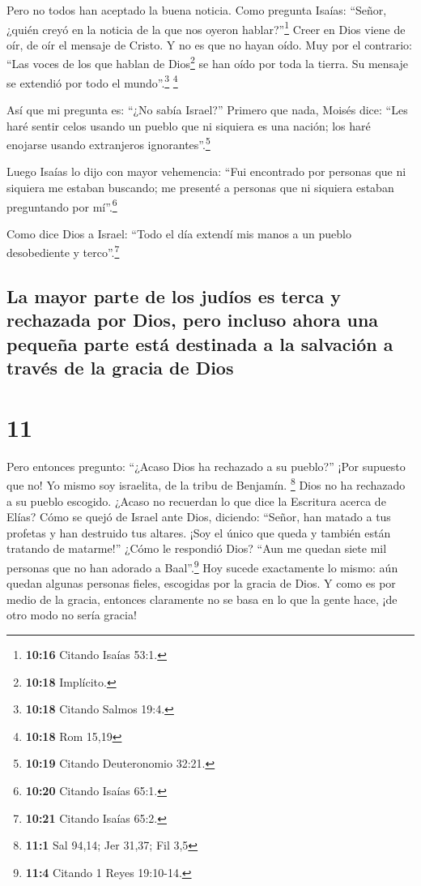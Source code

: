  Pero no todos han aceptado la buena noticia. Como
pregunta Isaías: ``Señor, ¿quién creyó en la noticia de la que nos
oyeron hablar?''\footnote{\textbf{10:16} Citando Isaías 53:1.}
 Creer en Dios viene de oír, de oír el mensaje de Cristo.
 Y no es que no hayan oído. Muy por el contrario: ``Las
voces de los que hablan de Dios\footnote{\textbf{10:18} Implícito.} se
han oído por toda la tierra. Su mensaje se extendió por todo el
mundo''.\footnote{\textbf{10:18} Citando Salmos 19:4.} \footnote{\textbf{10:18}
  Rom 15,19}

 Así que mi pregunta es: ``¿No sabía Israel?'' Primero
que nada, Moisés dice: ``Les haré sentir celos usando un pueblo que ni
siquiera es una nación; los haré enojarse usando extranjeros
ignorantes''.\footnote{\textbf{10:19} Citando Deuteronomio 32:21.}

 Luego Isaías lo dijo con mayor vehemencia: ``Fui
encontrado por personas que ni siquiera me estaban buscando; me presenté
a personas que ni siquiera estaban preguntando por mí''.\footnote{\textbf{10:20}
  Citando Isaías 65:1.}

 Como dice Dios a Israel: ``Todo el día extendí mis manos
a un pueblo desobediente y terco''.\footnote{\textbf{10:21} Citando
  Isaías 65:2.}

\hypertarget{la-mayor-parte-de-los-juduxedos-es-terca-y-rechazada-por-dios-pero-incluso-ahora-una-pequeuxf1a-parte-estuxe1-destinada-a-la-salvaciuxf3n-a-travuxe9s-de-la-gracia-de-dios}{%
\subsection{La mayor parte de los judíos es terca y rechazada por Dios,
pero incluso ahora una pequeña parte está destinada a la salvación a
través de la gracia de
Dios}\label{la-mayor-parte-de-los-juduxedos-es-terca-y-rechazada-por-dios-pero-incluso-ahora-una-pequeuxf1a-parte-estuxe1-destinada-a-la-salvaciuxf3n-a-travuxe9s-de-la-gracia-de-dios}}

\hypertarget{section-10}{%
\section{11}\label{section-10}}

 Pero entonces pregunto: ``¿Acaso Dios ha rechazado a su
pueblo?'' ¡Por supuesto que no! Yo mismo soy israelita, de la tribu de
Benjamín. \footnote{\textbf{11:1} Sal 94,14; Jer 31,37; Fil 3,5}
 Dios no ha rechazado a su pueblo escogido. ¿Acaso no
recuerdan lo que dice la Escritura acerca de Elías? Cómo se quejó de
Israel ante Dios, diciendo:  ``Señor, han matado a tus
profetas y han destruido tus altares. ¡Soy el único que queda y también
están tratando de matarme!''  ¿Cómo le respondió Dios?
``Aun me quedan siete mil personas que no han adorado a
Baal''.\footnote{\textbf{11:4} Citando 1 Reyes 19:10-14.} 
Hoy sucede exactamente lo mismo: aún quedan algunas personas fieles,
escogidas por la gracia de Dios.  Y como es por medio de
la gracia, entonces claramente no se basa en lo que la gente hace, ¡de
otro modo no sería gracia!

